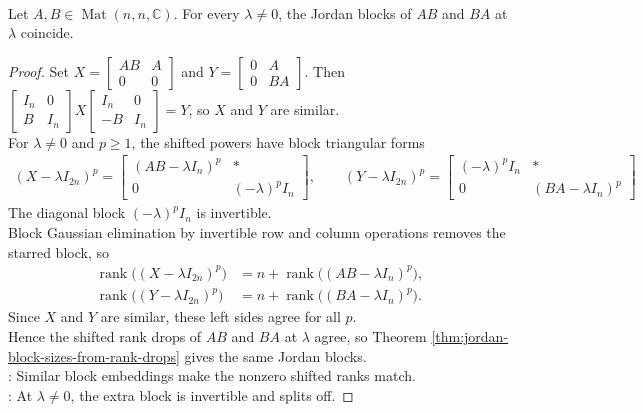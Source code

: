 \begin{theorem} \label{thm:ab-ba-same-nonzero-jordan-blocks} \\
Let $A,B\in\operatorname{Mat}(n,n,\mathbb{C})$. For every $\lambda\neq0$, the Jordan blocks of $AB$ and $BA$ at $\lambda$ coincide.
\begin{proof}
Set $X=\begin{bmatrix}AB&A\\0&0\end{bmatrix}$ and $Y=\begin{bmatrix}0&A\\0&BA\end{bmatrix}$. Then $\begin{bmatrix}I_n&0\\B&I_n\end{bmatrix}
X
\begin{bmatrix}I_n&0\\-B&I_n\end{bmatrix}
=Y$, so $X$ and $Y$ are similar.\\
For $\lambda\neq0$ and $p\geq1$, the shifted powers have block triangular forms
\begin{align}
(X-\lambda I_{2n})^p=
\begin{bmatrix}
(AB-\lambda I_n)^p&*\\
0&(-\lambda)^pI_n
\end{bmatrix},
\qquad
(Y-\lambda I_{2n})^p=
\begin{bmatrix}
(-\lambda)^pI_n&*\\
0&(BA-\lambda I_n)^p
\end{bmatrix} \nonumber
\end{align}
The diagonal block $(-\lambda)^pI_n$ is invertible.\\
Block Gaussian elimination by invertible row and column operations removes the starred block, so
\begin{align}
\operatorname{rank}\bigl((X-\lambda I_{2n})^p\bigr)
&=n+\operatorname{rank}\bigl((AB-\lambda I_n)^p\bigr), \nonumber\\
\operatorname{rank}\bigl((Y-\lambda I_{2n})^p\bigr)
&=n+\operatorname{rank}\bigl((BA-\lambda I_n)^p\bigr).
\nonumber
\end{align}
Since $X$ and $Y$ are similar, these left sides agree for all $p$.\\
Hence the shifted rank drops of $AB$ and $BA$ at $\lambda$ agree, so Theorem \ref{thm:jordan-block-sizes-from-rank-drops} gives the same Jordan blocks.\\
: Similar block embeddings make the nonzero shifted ranks match.\\
: At $\lambda\neq0$, the extra block is invertible and splits off.
\end{proof}
\end{theorem}

